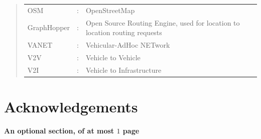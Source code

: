 \documentclass[ %
                    author={Alexander Hill},
                supervisor={Dr. Benjamin Sach},
                    degree={MEng},
                     title={MARMOSET},
                  subtitle={Multi-Agent Route Management using Online Simulation for Efficient Transportation},
                      type={research},
                      year={2016} ]{dissertation}
\begin{document}

\begin{quote}
\noindent
\begin{tabular}{lcl}
OSM                 &:     & OpenStreetMap \\
GraphHopper         &:     & Open Source Routing Engine, used for location to
    location routing requests \\
VANET               &:     & Vehicular-AdHoc NETwork \\
V2V                 &:     & Vehicle to Vehicle \\
V2I                 &:     & Vehicle to Infrastructure \\
\end{tabular}
\end{quote}


\chapter*{Acknowledgements}

{\bf An optional section, of at most $1$ page}
\vspace{1cm}




%
\end{document}
